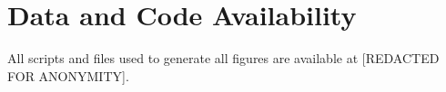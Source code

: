 \section{Data and Code Availability}

All scripts and files used to generate all figures are available at [REDACTED FOR ANONYMITY].
